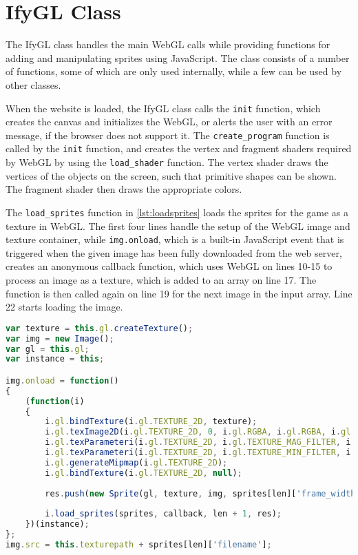 \section{IfyGL Class}
\label{sec:ifygl_class}

The IfyGL class handles the main WebGL calls while providing functions for adding and manipulating sprites using JavaScript.
The class consists of a number of functions, some of which are only used internally, while a few can be used by other classes.\newline

When the website is loaded, the IfyGL class calls the \texttt{init} function, which creates the canvas and initializes the WebGL, or alerts the user with an error message, if the browser does not support it.
The \texttt{create\_program} function is called by the \texttt{init} function, and creates the vertex and fragment shaders required by WebGL by using the \texttt{load\_shader} function.
The vertex shader draws the vertices of the objects on the screen, such that primitive shapes can be shown.
The fragment shader then draws the appropriate colors.

The \texttt{load\_sprites} function in \autoref{lst:loadsprites} loads the sprites for the game as a texture in WebGL.
The first four lines handle the setup of the WebGL image and texture container, while \texttt{img.onload}, which is a built-in JavaScript event that is triggered when the given image has been fully downloaded from the web server, creates an anonymous callback function, which uses WebGL on lines 10-15 to process an image as a texture, which is added to an array on line 17.
The function is then called again on line 19 for the next image in the input array.
Line 22 starts loading the image.

\begin{lstlisting}[language=JavaScript, caption=The function \texttt{load\_sprites}, label=lst:loadsprites]
var texture = this.gl.createTexture();
var img = new Image();
var gl = this.gl;
var instance = this;

img.onload = function()
{
	(function(i)
	{
		i.gl.bindTexture(i.gl.TEXTURE_2D, texture);
		i.gl.texImage2D(i.gl.TEXTURE_2D, 0, i.gl.RGBA, i.gl.RGBA, i.gl.UNSIGNED_BYTE, img);
		i.gl.texParameteri(i.gl.TEXTURE_2D, i.gl.TEXTURE_MAG_FILTER, i.gl.LINEAR);
		i.gl.texParameteri(i.gl.TEXTURE_2D, i.gl.TEXTURE_MIN_FILTER, i.gl.LINEAR_MIPMAP_NEAREST);
		i.gl.generateMipmap(i.gl.TEXTURE_2D);
		i.gl.bindTexture(i.gl.TEXTURE_2D, null);
		
		res.push(new Sprite(gl, texture, img, sprites[len]['frame_width'], sprites[len]['frame_height'], sprites[len]['origin']));
		
		i.load_sprites(sprites, callback, len + 1, res);
	})(instance);
};
img.src = this.texturepath + sprites[len]['filename'];
\end{lstlisting}

